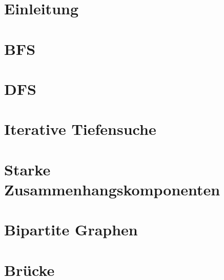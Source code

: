 

\setlength\textheight{7cm} %
	\begin{frame}
		\maketitle
	\end{frame}
	
	\section{Einleitung}
	
	
	\section{BFS}
	
	\section{DFS}
	
	\section{Iterative Tiefensuche}
	
	\section{Starke Zusammenhangskomponenten}
	
	\section{Bipartite Graphen}
	
	\section{Brücke}
	
